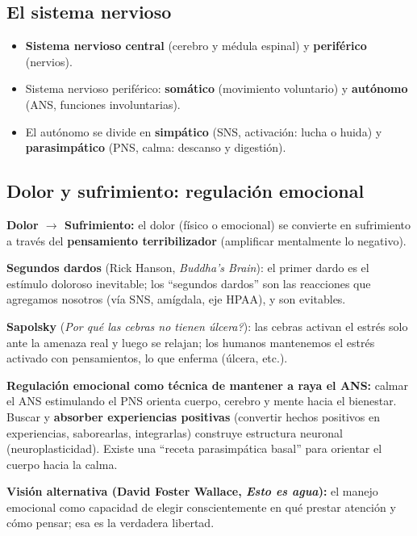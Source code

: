 \documentclass[11pt, a4paper]{article}
\begin{document}
\subsection{El sistema nervioso}

\begin{itemize}[nosep]
    \item \textbf{Sistema nervioso central} (cerebro y m\'edula espinal) y \textbf{perif\'erico} (nervios).
    \item Sistema nervioso perif\'erico: \textbf{som\'atico} (movimiento voluntario) y \textbf{aut\'onomo} (ANS, funciones involuntarias).
    \item El aut\'onomo se divide en \textbf{simp\'atico} (SNS, activaci\'on: lucha o huida) y \textbf{parasimp\'atico} (PNS, calma: descanso y digesti\'on).
\end{itemize}

\subsection{Dolor y sufrimiento: regulaci\'on emocional}

\textbf{Dolor $\to$ Sufrimiento:} el dolor (f\'isico o emocional) se convierte en sufrimiento a trav\'es del \textbf{pensamiento terribilizador} (amplificar mentalmente lo negativo).

\textbf{Segundos dardos} (Rick Hanson, \textit{Buddha's Brain}): el primer dardo es el est\'imulo doloroso inevitable; los ``segundos dardos'' son las reacciones que agregamos nosotros (v\'ia SNS, am\'igdala, eje HPAA), y son evitables.

\textbf{Sapolsky} (\textit{\textquestiondown Por qu\'e las cebras no tienen \'ulcera?}): las cebras activan el estr\'es solo ante la amenaza real y luego se relajan; los humanos mantenemos el estr\'es activado con pensamientos, lo que enferma (\'ulcera, etc.).

\textbf{Regulaci\'on emocional como t\'ecnica de mantener a raya el ANS:} calmar el ANS estimulando el PNS orienta cuerpo, cerebro y mente hacia el bienestar. Buscar y \textbf{absorber experiencias positivas} (convertir hechos positivos en experiencias, saborearlas, integrarlas) construye estructura neuronal (neuroplasticidad). Existe una ``receta parasimp\'atica basal'' para orientar el cuerpo hacia la calma.

\textbf{Visi\'on alternativa (David Foster Wallace, \textit{Esto es agua}):} el manejo emocional como capacidad de elegir conscientemente en qu\'e prestar atenci\'on y c\'omo pensar; esa es la verdadera libertad.
\end{document}
